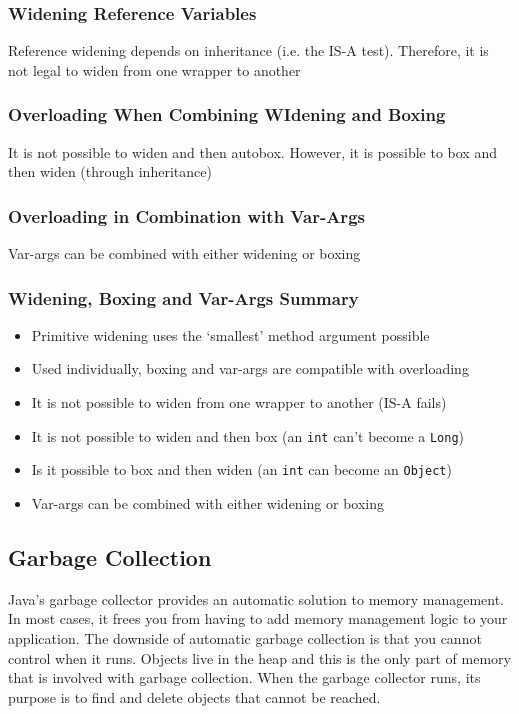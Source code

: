 \subsubsection{Widening Reference Variables}
Reference widening depends on inheritance (i.e. the IS-A test). Therefore, it 
is not legal to widen from one wrapper to another

\subsubsection{Overloading When Combining WIdening and Boxing}
It is not possible to widen and then autobox. However, it is possible to box 
and then widen (through inheritance)

\subsubsection{Overloading in Combination with Var-Args}
Var-args can be combined with either widening or boxing

\subsubsection{Widening, Boxing and Var-Args Summary}
\begin{itemize}
    \item Primitive widening uses the `smallest' method argument possible
    \item Used individually, boxing and var-args are compatible with 
    overloading
    \item It is not possible to widen from one wrapper to another (IS-A fails)
    \item It is not possible to widen and then box (an \verb#int# can't become 
    a \verb#Long#)
    \item Is it possible to box and then widen (an \verb#int# can become an 
    \verb#Object#)
    \item Var-args can be combined with either widening or boxing
\end{itemize}

\subsection{Garbage Collection}
Java's garbage collector provides an automatic solution to memory management.  
In most cases, it frees you from having to add memory management logic to your 
application. The downside of automatic garbage collection is that you cannot 
control when it runs. Objects live in the heap and this is the only part of 
memory that is involved with garbage collection. When the garbage collector 
runs, its purpose is to find and delete objects that cannot be reached.


